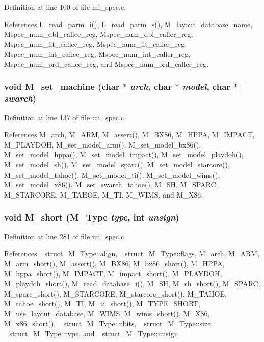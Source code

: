 Definition at line 100 of file mi\_\-spec.c.

References L\_\-read\_\-parm\_\-i(), L\_\-read\_\-parm\_\-s(), M\_\-layout\_\-database\_\-name, Mspec\_\-num\_\-dbl\_\-callee\_\-reg, Mspec\_\-num\_\-dbl\_\-caller\_\-reg, Mspec\_\-num\_\-flt\_\-callee\_\-reg, Mspec\_\-num\_\-flt\_\-caller\_\-reg, Mspec\_\-num\_\-int\_\-callee\_\-reg, Mspec\_\-num\_\-int\_\-caller\_\-reg, Mspec\_\-num\_\-prd\_\-callee\_\-reg, and Mspec\_\-num\_\-prd\_\-caller\_\-reg.
\subsubsection{\setlength{\rightskip}{0pt plus 5cm}void M\_\-set\_\-machine (char $\ast$ {\em arch}, char $\ast$ {\em model}, char $\ast$ {\em swarch})}\label{mi__spec_8c_f7bdbcffae1c00065683e3ede827e9f1}




Definition at line 137 of file mi\_\-spec.c.

References M\_\-arch, M\_\-ARM, M\_\-assert(), M\_\-BX86, M\_\-HPPA, M\_\-IMPACT, M\_\-PLAYDOH, M\_\-set\_\-model\_\-arm(), M\_\-set\_\-model\_\-bx86(), M\_\-set\_\-model\_\-hppa(), M\_\-set\_\-model\_\-impact(), M\_\-set\_\-model\_\-playdoh(), M\_\-set\_\-model\_\-sh(), M\_\-set\_\-model\_\-sparc(), M\_\-set\_\-model\_\-starcore(), M\_\-set\_\-model\_\-tahoe(), M\_\-set\_\-model\_\-ti(), M\_\-set\_\-model\_\-wims(), M\_\-set\_\-model\_\-x86(), M\_\-set\_\-swarch\_\-tahoe(), M\_\-SH, M\_\-SPARC, M\_\-STARCORE, M\_\-TAHOE, M\_\-TI, M\_\-WIMS, and M\_\-X86.
\subsubsection{\setlength{\rightskip}{0pt plus 5cm}void M\_\-short (\bf{M\_\-Type} {\em type}, int {\em unsign})}\label{mi__spec_8c_65c321d3074f61452f300327e7ddd8e7}




Definition at line 281 of file mi\_\-spec.c.

References \_\-struct\_\-M\_\-Type::align, \_\-struct\_\-M\_\-Type::flags, M\_\-arch, M\_\-ARM, M\_\-arm\_\-short(), M\_\-assert(), M\_\-BX86, M\_\-bx86\_\-short(), M\_\-HPPA, M\_\-hppa\_\-short(), M\_\-IMPACT, M\_\-impact\_\-short(), M\_\-PLAYDOH, M\_\-playdoh\_\-short(), M\_\-read\_\-database\_\-i(), M\_\-SH, M\_\-sh\_\-short(), M\_\-SPARC, M\_\-sparc\_\-short(), M\_\-STARCORE, M\_\-starcore\_\-short(), M\_\-TAHOE, M\_\-tahoe\_\-short(), M\_\-TI, M\_\-ti\_\-short(), M\_\-TYPE\_\-SHORT, M\_\-use\_\-layout\_\-database, M\_\-WIMS, M\_\-wims\_\-short(), M\_\-X86, M\_\-x86\_\-short(), \_\-struct\_\-M\_\-Type::nbits, \_\-struct\_\-M\_\-Type::size, \_\-struct\_\-M\_\-Type::type, and \_\-struct\_\-M\_\-Type::unsign.

